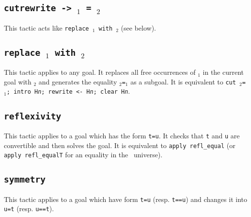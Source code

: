 \subsection{\tt cutrewrite -> \term$_1$ = \term$_2$}
\label{cutrewrite}

This tactic acts like {\tt replace {\term$_1$} with {\term$_2$}}
(see below).

\subsection{\tt replace {\term$_1$} with {\term$_2$}}
This tactic applies to any goal. It replaces all free occurrences of
{\term$_1$} in the current goal with {\term$_2$} and generates the
equality {\term$_2$}{\tt =}{\term$_1$} as a subgoal. It is equivalent
to {\tt cut \term$_2$=\term$_1$; intro H{\sl n}; rewrite <- H{\sl n}; 
  clear H{\sl n}}.

%  
%

\subsection{\tt reflexivity}
\label{reflexivity}
This tactic applies to a goal which has the form {\tt t=u}. It checks
that {\tt t} and {\tt u} are convertible and then solves the goal.
It is equivalent to {\tt apply refl\_equal} (or {\tt apply
  refl\_equalT} for an equality in the \Type\ universe).

\begin{ErrMsgs}
\item {}
\item {}
\end{ErrMsgs}

\subsection{\tt symmetry}
This tactic applies to a goal which have form {\tt t=u}
(resp. \texttt{t==u}) and changes it into {\tt u=t} (resp. \texttt{u==t}).

